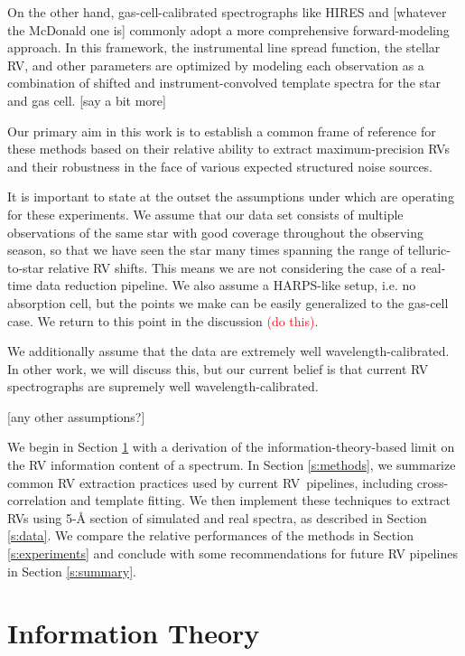 \documentclass[modern]{aastex61}
\newcommand{\todo}[1]{\textcolor{red}{#1}}  %
\newcommand{\acronym}[1]{{\small{#1}}}
\newcommand{\RV}{\acronym{RV}}
\begin{document}
On the other hand, gas-cell-calibrated spectrographs like HIRES and [whatever the McDonald one is] commonly adopt a more comprehensive forward-modeling approach. 
In this framework, the instrumental line spread function, the stellar RV, and other parameters are optimized by modeling each observation as a combination of shifted and instrument-convolved template spectra for the star and gas cell. [say a bit more]

Our primary aim in this work is to establish a common frame of reference for these methods based on their relative ability to extract maximum-precision RVs and their robustness in the face of various expected structured noise sources.

It is important to state at the outset the assumptions under which are operating for these experiments. 
We assume that our data set consists of multiple observations of the same star with good coverage throughout the observing season, so that we have seen the star many times spanning the range of telluric-to-star relative RV shifts. 
This means we are not considering the case of a real-time data reduction pipeline. 
We also assume a HARPS-like setup, i.e. no absorption cell, but the points we make can be easily generalized to the gas-cell case. 
We return to this point in the discussion \todo{(do this)}.

We additionally assume that the data are extremely well wavelength-calibrated. 
In other work, we will discuss this, but our current belief is that current RV spectrographs are supremely well wavelength-calibrated.

[any other assumptions?]

We begin in Section \ref{s:info} with a derivation of the information-theory-based limit on the RV information content of a spectrum. 
In Section \ref{s:methods}, we summarize common RV extraction practices used by current \RV\ pipelines, including cross-correlation and template fitting. 
We then implement these techniques to extract \RV s using 5-\r{A} section of simulated and real spectra, as described in Section \ref{s:data}. 
We compare the relative performances of the methods in Section \ref{s:experiments} and conclude with some recommendations for future RV pipelines in Section \ref{s:summary}. 



\section{Information Theory}
\label{s:info}
\end{document}
